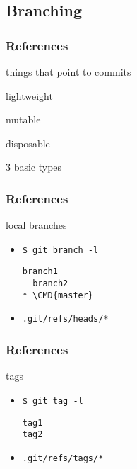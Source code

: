 \documentclass[english]{beamer}
\newcommand{\mysubsection}[2]{%
  \hypertarget{#2}{}%
  \subsection{#1}%
  \label{#2}%
}
\newcommand{\CMD}[1]{%
\texttt{\textcolor{code-green}{#1}}%
}
\newcommand{\cmd}[1]{%
\texttt{\textcolor{code-orange}{#1}}%
}
\begin{document}
\mysubsection{Branching}{using:branching}
\begin{frame}
\frametitle{References}
things that point to commits

\pause{}
\vspace{\baselineskip}
lightweight

\pause{}
\vspace{\baselineskip}
mutable

\pause{}
\vspace{\baselineskip}
disposable

\pause{}
\vspace{\baselineskip}
3 basic types

\end{frame}

\begin{frame}[fragile]
\frametitle{References}
local branches
\begin{itemize}
        \item \CMD{\$ git branch -l} \\
                {\small
                \begin{Verbatim}[commandchars=\\\{\}]
  branch1
  branch2
* \CMD{master}
                \end{Verbatim}
                }
        \item \cmd{.git/refs/heads/*}
\end{itemize}
\end{frame}

\begin{frame}[fragile]
\frametitle{References}
tags
\begin{itemize}
        \item \CMD{\$ git tag -l} \\
                {\small
                \begin{Verbatim}[commandchars=\\\{\}]
tag1
tag2
                \end{Verbatim}
                }
        \item \cmd{.git/refs/tags/*}
\end{itemize}
\end{frame}
\end{document}
